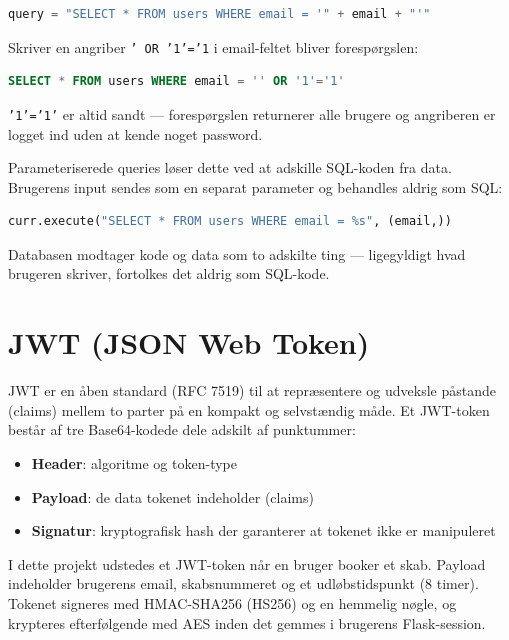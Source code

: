 \documentclass[a4paper,12pt]{article}
\begin{document}
\begin{lstlisting}[language=Python]
query = "SELECT * FROM users WHERE email = '" + email + "'"
\end{lstlisting}

Skriver en angriber \texttt{' OR '1'='1} i email-feltet bliver forespørgslen:

\begin{lstlisting}[language=SQL]
SELECT * FROM users WHERE email = '' OR '1'='1'
\end{lstlisting}

\texttt{'1'='1'} er altid sandt — forespørgslen returnerer alle brugere og angriberen er logget ind uden at kende noget password.

Parameteriserede queries løser dette ved at adskille SQL-koden fra data. Brugerens input sendes som en separat parameter og behandles aldrig som SQL:

\begin{lstlisting}[language=Python]
curr.execute("SELECT * FROM users WHERE email = %s", (email,))
\end{lstlisting}

Databasen modtager kode og data som to adskilte ting — ligegyldigt hvad brugeren skriver, fortolkes det aldrig som SQL-kode.

\section{JWT (JSON Web Token)}

JWT er en åben standard (RFC 7519) til at repræsentere og udveksle påstande (claims) mellem to parter på en kompakt og selvstændig måde. Et JWT-token består af tre Base64-kodede dele adskilt af punktummer:

\begin{itemize}
    \item \textbf{Header}: algoritme og token-type
    \item \textbf{Payload}: de data tokenet indeholder (claims)
    \item \textbf{Signatur}: kryptografisk hash der garanterer at tokenet ikke er manipuleret
\end{itemize}

I dette projekt udstedes et JWT-token når en bruger booker et skab. Payload indeholder brugerens email, skabsnummeret og et udløbstidspunkt (8 timer). Tokenet signeres med HMAC-SHA256 (HS256) og en hemmelig nøgle, og krypteres efterfølgende med AES inden det gemmes i brugerens Flask-session.
\end{document}
